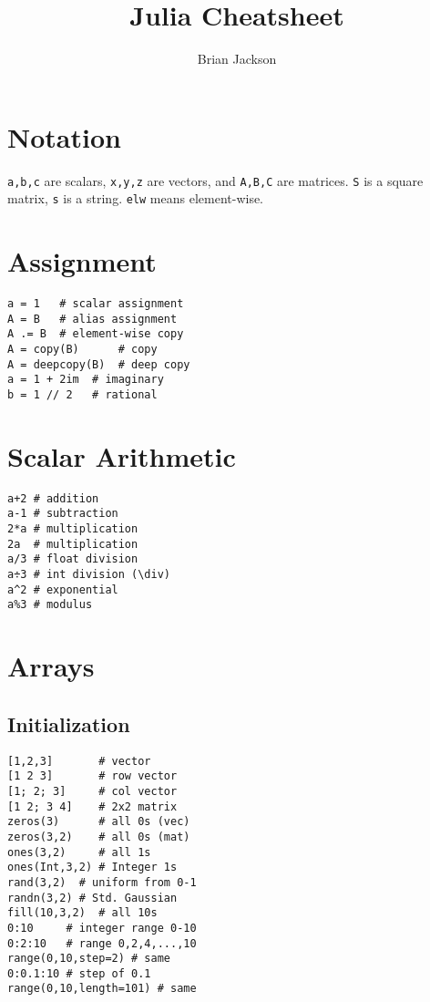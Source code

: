 \documentclass{article}
\title{Julia Cheatsheet}
\author{Brian Jackson}
\begin{document}
\maketitle
\begin{multicols*}{3}
\section{Notation}
\texttt{a,b,c} are scalars,
\texttt{x,y,z} are vectors, and
\texttt{A,B,C} are matrices.
\texttt{S} is a square matrix,
\texttt{s} is a string.
\texttt{elw} means element-wise.

\section{Assignment}
\begin{verbatim}
a = 1   # scalar assignment
A = B   # alias assignment
A .= B  # element-wise copy
A = copy(B)      # copy
A = deepcopy(B)  # deep copy
a = 1 + 2im  # imaginary
b = 1 // 2   # rational
\end{verbatim}

\section{Scalar Arithmetic}
\begin{verbatim}
a+2 # addition 
a-1 # subtraction
2*a # multiplication
2a  # multiplication
a/3 # float division
a÷3 # int division (\div)
a^2 # exponential
a%3 # modulus
\end{verbatim}

\section{Arrays}
\subsection{Initialization}
\vspace*{-2mm}
\begin{verbatim}
[1,2,3]       # vector
[1 2 3]       # row vector
[1; 2; 3]     # col vector
[1 2; 3 4]    # 2x2 matrix
zeros(3)      # all 0s (vec)
zeros(3,2)    # all 0s (mat)
ones(3,2)     # all 1s 
ones(Int,3,2) # Integer 1s
rand(3,2)  # uniform from 0-1
randn(3,2) # Std. Gaussian 
fill(10,3,2)  # all 10s
0:10     # integer range 0-10
0:2:10   # range 0,2,4,...,10
range(0,10,step=2) # same
0:0.1:10 # step of 0.1
range(0,10,length=101) # same
\end{verbatim}


\end{multicols*}
\end{document}
